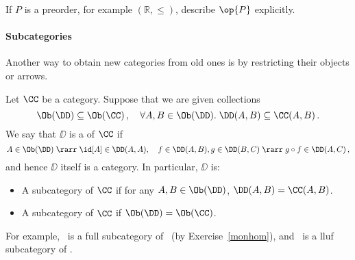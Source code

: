 \documentclass[12pt]{article}
\begin{document}
\begin{myexercise}
If $P$ is a preorder, for example $(\mathbb{R}, \leq )$, describe $\op{P}$ explicitly.
\end{myexercise}

\paragraph{Subcategories} Another way to obtain new categories from old ones is by restricting their objects or arrows.

\begin{mydefinition}
Let $\CC$ be a category. Suppose that we are given collections
\[ \Ob(\DD)\subseteq \Ob(\CC)\,,\quad\forall A,B\in \Ob(\DD).\; \DD(A,B)\subseteq\CC(A,B)\,. \]
We say that $\DD$ is a  of $\CC$ if
\[ A \in \Ob(\DD) \; \rarr \; \id[A] \in \DD(A, A), \quad f \in \DD(A, B), g  \in \DD(B, C) \; \rarr \; g \circ f \in \DD(A, C) \, , \]
and hence $\DD$ itself is a category.
In particular, $\DD$ is:
\begin{itemize}
  \item A  subcategory of $\CC$ if  for any $A,B\in \Ob(\DD)$, $\DD(A,B)=\CC(A,B)$.
  \item A  subcategory of $\CC$ if $\Ob(\DD)=\Ob(\CC)$. \deq
\end{itemize}
\end{mydefinition}
For example, \Grp\ is a full subcategory of \Mon\ (by Exercise~\ref{monhom}), and \Set\ is a lluf subcategory of \Rel.
\end{document}
